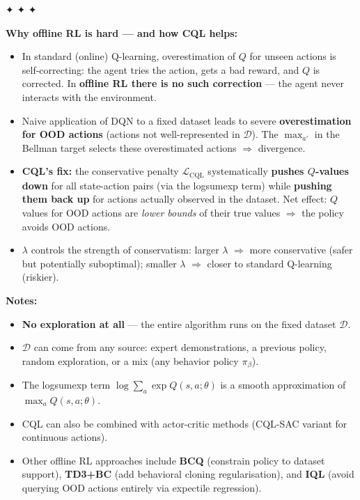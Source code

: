 \documentclass[11pt]{article}
\providecommand{\tightlist}{%
      \setlength{\itemsep}{0pt}\setlength{\parskip}{0pt}}
\begin{document}
✦ ✦ ✦

\textbf{Why offline RL is hard --- and how CQL helps:}

\begin{itemize}
\tightlist
\item
  In standard (online) Q-learning, overestimation of \(Q\) for unseen
  actions is self-correcting: the agent tries the action, gets a bad
  reward, and \(Q\) is corrected. In \textbf{offline RL there is no such
  correction} --- the agent never interacts with the environment.
\item
  Naive application of DQN to a fixed dataset leads to severe
  \textbf{overestimation for OOD actions} (actions not well-represented
  in \(\mathcal{D}\)). The \(\max_{a'}\) in the Bellman target selects
  these overestimated actions \(\Rightarrow\) divergence.
\item
  \textbf{CQL's fix:} the conservative penalty
  \(\mathcal{L}_\text{CQL}\) systematically \textbf{pushes \(Q\)-values
  down} for all state-action pairs (via the logsumexp term) while
  \textbf{pushing them back up} for actions actually observed in the
  dataset. Net effect: \(Q\) values for OOD actions are \emph{lower
  bounds} of their true values \(\Rightarrow\) the policy avoids OOD
  actions.
\item
  \(\lambda\) controls the strength of conservatism: larger \(\lambda\)
  \(\Rightarrow\) more conservative (safer but potentially suboptimal);
  smaller \(\lambda\) \(\Rightarrow\) closer to standard Q-learning
  (riskier).
\end{itemize}

\textbf{Notes:}

\begin{itemize}
\tightlist
\item
  \textbf{No exploration at all} --- the entire algorithm runs on the
  fixed dataset \(\mathcal{D}\).
\item
  \(\mathcal{D}\) can come from any source: expert demonstrations, a
  previous policy, random exploration, or a mix (any behavior policy
  \(\pi_\beta\)).
\item
  The logsumexp term \(\log\sum_a \exp Q(s,a;\theta)\) is a smooth
  approximation of \(\max_a Q(s,a;\theta)\).
\item
  CQL can also be combined with actor-critic methods (CQL-SAC variant
  for continuous actions).
\item
  Other offline RL approaches include \textbf{BCQ} (constrain policy to
  dataset support), \textbf{TD3+BC} (add behavioral cloning
  regularisation), and \textbf{IQL} (avoid querying OOD actions entirely
  via expectile regression).
\end{itemize}
\end{document}
